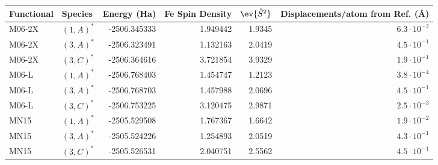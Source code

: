 \begin{tabular}{llrrrr}
\toprule
Functional &    Species &  Energy (Ha) &  Fe Spin Density &  $\ev{\hat{S}^2}$ & Displacements/atom from Ref. (Å) \\
\midrule
    M06-2X &  $(1,A)^*$ & -2506.345333 &         1.949442 &            1.9345 &              $6.3 \cdot 10^{-2}$ \\
    M06-2X &  $(3,A)^*$ & -2506.323491 &         1.132163 &            2.0419 &              $4.5 \cdot 10^{-1}$ \\
    M06-2X &  $(3,C)^*$ & -2506.364616 &         3.721854 &            3.9329 &              $1.9 \cdot 10^{-1}$ \\
     M06-L &  $(1,A)^*$ & -2506.768403 &         1.454747 &            1.2123 &              $3.8 \cdot 10^{-4}$ \\
     M06-L &  $(3,A)^*$ & -2506.768703 &         1.457988 &            2.0696 &              $4.5 \cdot 10^{-1}$ \\
     M06-L &  $(3,C)^*$ & -2506.753225 &         3.120475 &            2.9871 &              $2.5 \cdot 10^{-3}$ \\
      MN15 &  $(1,A)^*$ & -2505.529508 &         1.767367 &            1.6642 &              $1.9 \cdot 10^{-2}$ \\
      MN15 &  $(3,A)^*$ & -2505.524226 &         1.254893 &            2.0519 &              $4.3 \cdot 10^{-1}$ \\
      MN15 &  $(3,C)^*$ & -2505.526531 &         2.040751 &            2.5562 &              $4.5 \cdot 10^{-1}$ \\
\bottomrule
\end{tabular}
